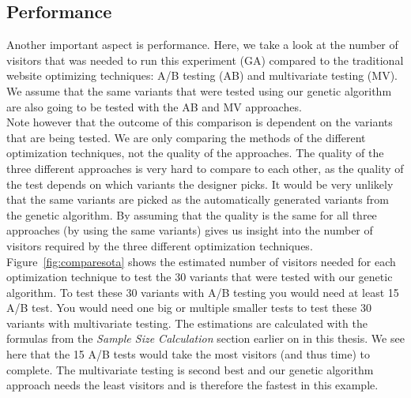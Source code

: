 \documentclass{report}
\begin{document}
\FloatBarrier
\subsection{Performance}
Another important aspect is performance. Here, we take a look at the number of visitors that was needed to run this experiment (GA) compared to the traditional website optimizing techniques: A/B testing (AB) and multivariate testing (MV). We assume that the same variants that were tested using our genetic algorithm are also going to be tested with the AB and MV approaches.\\

Note however that the outcome of this comparison is dependent on the variants that are being tested. We are only comparing the methods of the different optimization techniques, not the quality of the approaches. The quality of the three different approaches is very hard to compare to each other, as the quality of the test depends on which variants the designer picks. It would be very unlikely that the same variants are picked as the automatically generated variants from the genetic algorithm. By assuming that the quality is the same for all three approaches (by using the same variants) gives us insight into the number of visitors required by the three different optimization techniques. \\

Figure~\ref{fig:comparesota} shows the estimated number of visitors needed for each optimization technique to test the 30 variants that were tested with our genetic algorithm. To test these 30 variants with A/B testing you would need at least 15 A/B test. You would need one big or multiple smaller tests to test these 30 variants with multivariate testing. The estimations are calculated with the formulas from the \textit{Sample Size Calculation} section earlier on in this thesis. We see here that the 15 A/B tests would take the most visitors (and thus time) to complete. The multivariate testing is second best and our genetic algorithm approach needs the least visitors and is therefore the fastest in this example.\\
\end{document}

